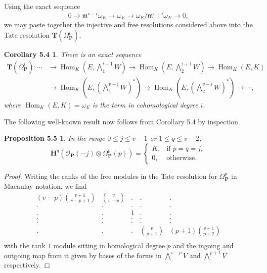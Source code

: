 \documentclass{tran-l}
\newcommand{\myHom}{\operatorname{Hom}}
\newcommand{\myH}{\mathbf{H}}
\newcommand{\myP}{\mathbf{P}}
\newcommand{\TT}{\mathbf{T}}
\newcommand{\gm}{{\mathfrak{m}}}
\theoremstyle{plain}
\newtheorem*{theorem22}{Corollary 5.4}
\newtheorem*{theorem23}{Proposition 5.5}
\theoremstyle{remark}
\theoremstyle{definition}
\begin{document}
Using the exact sequence
\begin{equation*}0\to \gm ^{v-i}\omega _{E}\to \omega _{E}\to \omega _{E}/\gm
^{v-i}\omega _{E}\to 0,
\end{equation*}
we may paste together the injective and free resolutions considered above
into the Tate resolution $\TT (\Omega ^{i}_{\myP })$.
\begin{theorem22}
There is an exact sequence 
\begin{equation*}\begin{split}\TT (\Omega ^{i}_{\myP })\!:
\cdots &\to \myHom _{K}(E,\textstyle{\bigwedge ^{i+1}_{1}}W)\to \myHom _{K}
(E,\textstyle{\bigwedge ^{i+1}_{2}}W)
\to \myHom _{K}(E,K) \\
&\to \myHom _{K}(E,(\textstyle{\bigwedge ^{v-i}_{1}}W)^{*})\to \myHom _{K}
(E,(\textstyle{\bigwedge ^{v-i}_{2}}W)^{*})
\to \cdots, \end{split}\end{equation*}
where $\myHom _{K}(E,K)=\omega _{E}$ is the term in cohomological degree $i$.
\end{theorem22}


The following well-known result now follows from Corollary 5.4
by inspection.
\begin{theorem23}
In the range $ 0 \le j \le v-1$  or  $1 \le q \le v-2$,
\begin{equation*}\myH ^{q}(\mathcal{O} _{\myP }(-j)\otimes 
\Omega _{\myP }^{p}(p)) =
\begin{cases}K, & \text{if }p=q=j, \\
 0, & \text{otherwise}. 
\end{cases}
\end{equation*}
\end{theorem23}


\begin{proof}  Writing the ranks of the free modules in the Tate resolution
for $\Omega _{\myP }^{p}$ in
Macaulay notation, we find
\begin{equation*}\begin{matrix}(v-p){\binom{v+1 }{v-p+1}} & {\binom{v }{v- p}}  & . & . & .  \\
  . & . & . & . & .  \\
  . & . & 1 & . & .  \\
  . & . & . & . & .  \\
  . & . & . & . & .  \\
  . & . & . & {\binom{v }{p+1}} &  (p+1){\binom{v+1 }{p+2}} 
   \\
\end{matrix}
\end{equation*}
with the rank $1$ module sitting in homological degree $p$ and the ingoing
and outgoing
 map from it given by bases of the forms in $\bigwedge ^{v-p} V$ and
$\bigwedge ^{p+1} V$ respectively.
\end{proof}
\end{document}
